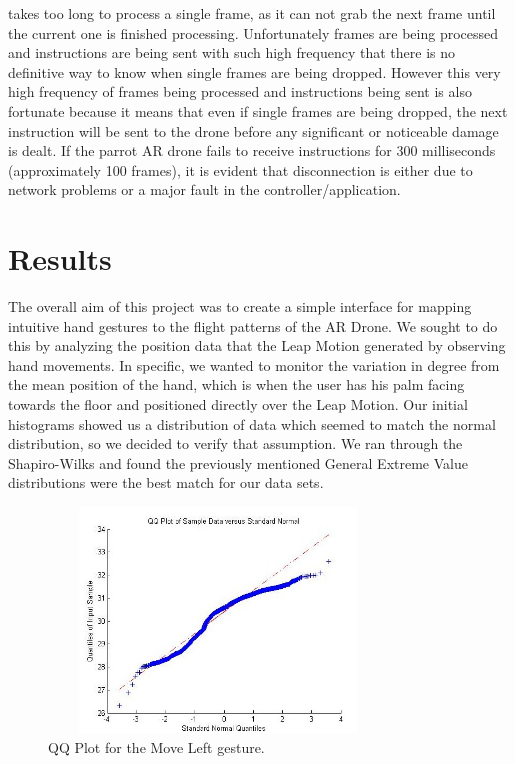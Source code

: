 \documentclass[letterpaper,english, 12pt]{article}
\begin{document}
takes too long to process a single frame, as it can not grab the next frame until the current one is finished processing. Unfortunately frames are being processed and instructions are being sent with such high frequency that there is no definitive way to know when single frames are being dropped. However this very high frequency of frames being processed and instructions being sent is also fortunate because it means that even if single frames are being dropped, the next instruction will be sent to the drone before any significant or noticeable  damage is dealt. If the parrot AR drone fails to receive instructions for 300 milliseconds (approximately 100 frames), it  is evident that disconnection is either due to network problems or a major fault in the controller/application. 


\section*{Results}

The overall aim of this project was to create a simple interface for mapping intuitive hand gestures to the flight patterns of the AR Drone. We sought to do this by analyzing the position data that the Leap Motion generated by observing hand movements. In specific, we wanted to monitor the variation in degree from the mean position of the hand, which is when the user has his palm facing towards the floor and positioned directly over the Leap Motion. Our initial histograms showed us a distribution of data which seemed to match the normal distribution, so we decided to verify that assumption. We ran through the Shapiro-Wilks and found the previously mentioned General Extreme Value distributions were the best match for our data sets.

\begin{figure}[H]
	\centering
	\includegraphics[height=6cm,width=90mm]{pics/qqLeft.jpg}
	\caption{QQ Plot for the Move Left gesture.}
\end{figure}
\end{document}
